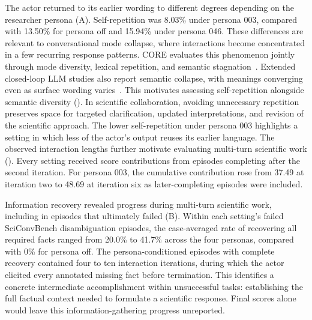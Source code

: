 The actor returned to its earlier wording to different degrees depending
on the researcher persona (A). Self-repetition
was 8.03\% under persona 003, compared with 13.50\% for persona off
and 15.94\% under persona 046. These differences are relevant to
conversational mode collapse, where interactions become concentrated in
a few recurring response patterns. CORE evaluates this phenomenon
jointly through mode diversity, lexical repetition, and semantic
stagnation~\cite{pandey2026core}. Extended closed-loop LLM studies
also report semantic collapse, with meanings converging even as surface
wording varies~\cite{kong2026semanticcollapse}. This motivates assessing
self-repetition alongside semantic diversity
(). In scientific collaboration, avoiding
unnecessary repetition preserves space for targeted clarification,
updated interpretations, and revision of the scientific approach.
The lower self-repetition under persona 003 highlights a setting in
which less of the actor's output reuses its earlier language.
The observed interaction lengths further motivate evaluating multi-turn
scientific work (). Every setting received score
contributions from episodes completing after the second iteration. For
persona 003, the cumulative contribution rose from 37.49 at iteration two
to 48.69 at iteration six as later-completing episodes were included.

Information recovery revealed progress during multi-turn scientific work,
including in episodes that ultimately failed (B).
Within each setting's failed SciConvBench disambiguation episodes,
the case-averaged rate of recovering all required facts ranged from
20.0\% to 41.7\% across the four personas, compared with 0\% for
persona off. The persona-conditioned episodes with complete recovery
contained four to ten interaction iterations, during which the actor
elicited every annotated missing fact before termination. This identifies
a concrete intermediate accomplishment within unsuccessful tasks:
establishing the full factual context needed to formulate a scientific
response. Final scores alone would leave this information-gathering
progress unreported.
